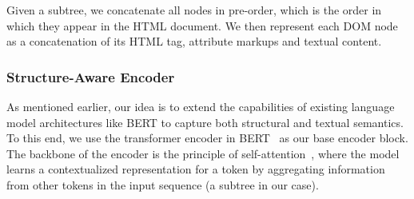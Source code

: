 \documentclass[sigconf, nonacm]{acmart}
\newcommand{\nop}[1]{}
\begin{document}
Given a subtree, we concatenate all nodes in pre-order, which is the order in which they appear in the HTML document. We then represent each DOM node as a concatenation of its HTML tag, attribute markups and textual content. \nop{I feel the reader can easily get lost in the tree-pruning details. However since this is key part of how we manage to create the right input, an example would help here. If space is a constraint, we can later even consider omitting the algorithm altogether, but an example would certainly help.}

\subsubsection{Structure-Aware Encoder}

As mentioned earlier, our idea is to extend the capabilities of existing language model architectures like BERT to capture both structural and textual semantics. To this end, we use the transformer encoder in BERT~\cite{devlin-etal-2019-bert} as our base encoder block. The backbone of the encoder is the principle of self-attention~\cite{vaswani2017attention}, where the model learns a contextualized representation for a token by aggregating information from other tokens in the input sequence (a subtree in our case). 
\end{document}
